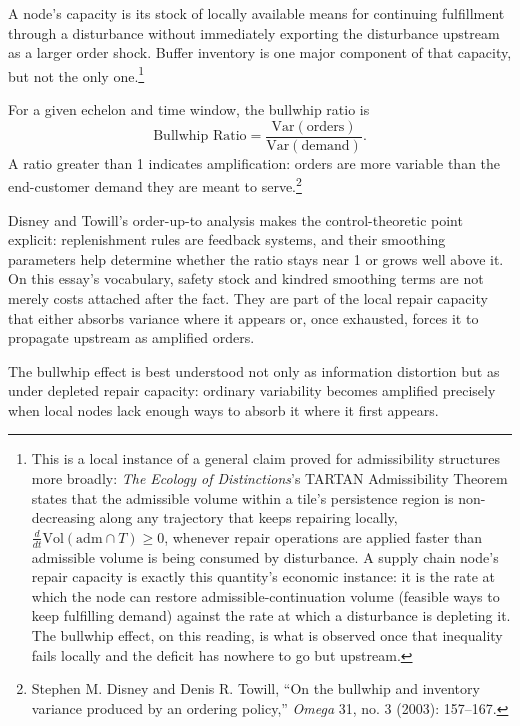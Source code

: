 \documentclass[11pt]{article}
\begin{document}
\begin{definition}
A node's \repair capacity is its stock of locally available means for continuing fulfillment through a disturbance without immediately exporting the disturbance upstream as a larger order shock. Buffer inventory is one major component of that capacity, but not the only one.\footnote{This is a local instance of a general claim proved for admissibility structures more broadly: \emph{The Ecology of Distinctions}'s TARTAN Admissibility Theorem states that the admissible volume within a tile's persistence region is non-decreasing along any trajectory that keeps repairing locally, $\frac{d}{dt}\mathrm{Vol}(\mathrm{adm}\cap T) \geq 0$, whenever repair operations are applied faster than admissible volume is being consumed by disturbance. A supply chain node's repair capacity is exactly this quantity's economic instance: it is the rate at which the node can restore admissible-continuation volume (feasible ways to keep fulfilling demand) against the rate at which a disturbance is depleting it. The bullwhip effect, on this reading, is what is observed once that inequality fails locally and the deficit has nowhere to go but upstream.}
\end{definition}

\begin{definition}
For a given echelon and time window, the bullwhip ratio is
\[
\text{Bullwhip Ratio} = \frac{\mathrm{Var}(\text{orders})}{\mathrm{Var}(\text{demand})}.
\]
A ratio greater than 1 indicates amplification: orders are more variable than the end-customer demand they are meant to serve.\footnote{Stephen M. Disney and Denis R. Towill, ``On the bullwhip and inventory variance produced by an ordering policy,'' \emph{Omega} 31, no. 3 (2003): 157--167.}
\end{definition}

Disney and Towill's order-up-to analysis makes the control-theoretic point explicit: replenishment rules are feedback systems, and their smoothing parameters help determine whether the ratio stays near 1 or grows well above it. On this essay's vocabulary, safety stock and kindred smoothing terms are not merely costs attached after the fact. They are part of the local repair capacity that either absorbs variance where it appears or, once exhausted, forces it to propagate upstream as amplified orders.

\begin{claim}
The bullwhip effect is best understood not only as information distortion but as \continuation under depleted repair capacity: ordinary variability becomes amplified precisely when local nodes lack enough \admissible ways to absorb it where it first appears.
\end{claim}
\end{document}
